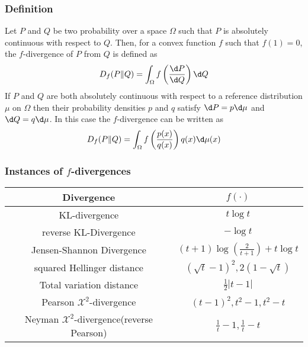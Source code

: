 \subsubsection{Definition}
Let $P$ and $Q$ be two probability over a space $\Omega$ such that $P$ is absolutely continuous with respect to
$Q$. Then, for a convex function $f$ such that $f(1)=0$, the $f$-divergence of $P$ from $Q$ is defined as
\begin{equation}
    D_f(P\|Q) = \int_{\Omega}f\left(\frac{\d P}{\d Q}\right) \d Q
\end{equation}
If $P$ and $Q$ are both absolutely continuous with respect to a reference distribution $\mu$ on $\Omega$ then their
probability densities $p$ and $q$ satisfy $\d P = p \d \mu$ and $\d Q = q \d \mu$. In this case the $f$-divergence can
be written as
\begin{equation}
    D_f(P\|Q) = \int_{\Omega} f\left(\frac{p(x)}{q(x)}\right) q(x) \d \mu(x)
\end{equation}

\subsubsection{Instances of $f$-divergences}

\begin{center}
    \begin{tabular}{cc}
        \toprule
        Divergence & $f(\cdot)$ \\
        \midrule
        KL-divergence & $t\log{t}$ \\
        reverse KL-Divergence & $-\log{t}$ \\
        Jensen-Shannon Divergence & $(t+1)\log(\frac{2}{t+1}) + t\log t$ \\
        squared Hellinger distance & $(\sqrt{t} - 1)^2, 2(1 - \sqrt{t})$ \\
        Total variation distance & $\frac{1}{2}|t-1|$ \\
        Pearson $\mathcal{X}^2$-divergence & $(t-1)^2, t^2 - 1, t^2 - t$ \\
        Neyman $\mathcal{X}^2$-divergence(reverse Pearson) & $\frac{1}{t} - 1, \frac{1}{t} - t$ \\
        \bottomrule
    \end{tabular}
\end{center}

